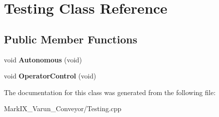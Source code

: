 \hypertarget{class_testing}{\section{Testing Class Reference}
\label{class_testing}
}
\subsection*{Public Member Functions}
\begin{DoxyCompactItemize}
\item 
\hypertarget{class_testing_a7d268d698c9a059466eb74a8bf356652}{void {\bfseries Autonomous} (void)}\label{class_testing_a7d268d698c9a059466eb74a8bf356652}

\item 
\hypertarget{class_testing_a0f1036b6176326cd3d1c43d717635567}{void {\bfseries Operator\-Control} (void)}\label{class_testing_a0f1036b6176326cd3d1c43d717635567}

\end{DoxyCompactItemize}


The documentation for this class was generated from the following file\-:\begin{DoxyCompactItemize}
\item 
Mark\-I\-X\-\_\-\-Varun\-\_\-\-Conveyor/Testing.\-cpp\end{DoxyCompactItemize}
